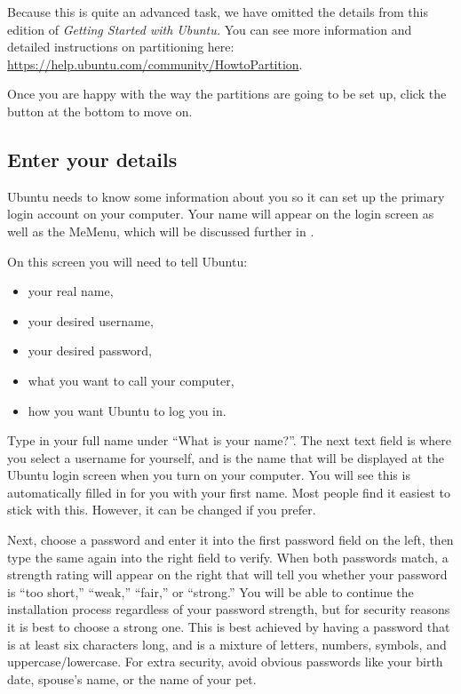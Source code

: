 Because this is quite an advanced task, we have omitted the details from this edition of \emph{Getting Started with Ubuntu.} You can see more information and detailed instructions on partitioning here: \url{https://help.ubuntu.com/community/HowtoPartition}.

Once you are happy with the way the partitions are going to be set up, click the  button at the bottom to move on.

\subsection{Enter your details}

Ubuntu needs to know some information about you so it can set up the primary login account on your computer. Your name will appear on the login screen as well as the \gls{MeMenu}, which will be discussed further in .

On this screen you will need to tell Ubuntu:

\begin{itemize}
	\item your real name,
	\item your desired username,
	\item your desired password,
	\item what you want to call your computer,
	\item how you want Ubuntu to log you in.
\end{itemize}


Type in your full name under ``What is your name?''. The next text field is where you select a username for yourself, and is the name that will be displayed at the Ubuntu login screen when you turn on your computer. You will see this is automatically filled in for you with your first name. Most people find it easiest to stick with this. However, it can be changed if you prefer. 

Next, choose a password and enter it into the first password field on the left, then type the same again into the right field to verify. When both passwords match, a strength rating will appear on the right that will tell you whether your password is ``too short,'' ``weak,'' ``fair,'' or ``strong.'' You will be able to continue the installation process regardless of your password strength, but for security reasons it is best to choose a strong one. This is best achieved by having a password that is at least six characters long, and is a mixture of letters, numbers, symbols, and uppercase/lowercase. For extra security, avoid obvious passwords like your birth date, spouse's name, or the name of your pet. 

